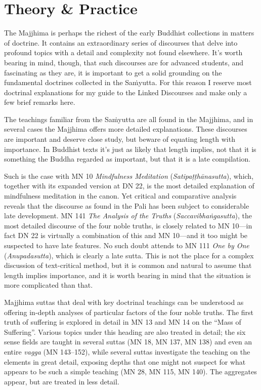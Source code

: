 \documentclass[12pt,openany]{book}%
\begin{document}
\section*{Theory \& Practice}

The Majjhima is perhaps the richest of the early Buddhist collections in matters of doctrine. It contains an extraordinary series of discourses that delve into profound topics with a detail and complexity not found elsewhere. It’s worth bearing in mind, though, that such discourses are for advanced students, and fascinating as they are, it is important to get a solid grounding on the fundamental doctrines collected in the \textsanskrit{Saṁyutta}. For this reason I reserve most doctrinal explanations for my guide to the Linked Discourses and make only a few brief remarks here.

The teachings familiar from the \textsanskrit{Saṁyutta} are all found in the Majjhima, and in several cases the Majjhima offers more detailed explanations. These discourses are important and deserve close study, but beware of equating length with importance. In Buddhist texts it’s just as likely that length implies, not that it is something the Buddha regarded as important, but that it is a late compilation.

Such is the case with MN 10 \textit{Mindfulness Meditation} (\textit{\textsanskrit{Satipaṭṭhānasutta}}), which, together with its expanded version at DN 22, is the most detailed explanation of mindfulness meditation in the canon. Yet critical and comparative analysis reveals that the discourse as found in the Pali has been subject to considerable late development. MN 141 \textit{The Analysis of the Truths} (\textit{\textsanskrit{Saccavibhaṅgasutta}}), the most detailed discourse of the four noble truths, is closely related to MN 10—in fact DN 22 is virtually a combination of this and MN 10—and it too might be suspected to have late features. No such doubt attends to MN 111 \textit{One by One} (\textit{Anupadasutta}), which is clearly a late sutta. This is not the place for a complex discussion of text-critical method, but it is common and natural to assume that length implies importance, and it is worth bearing in mind that the situation is more complicated than that.

Majjhima suttas that deal with key doctrinal teachings can be understood as offering in-depth analyses of particular factors of the four noble truths. The first truth of suffering is explored in detail in MN 13 and MN 14 on the “Mass of Suffering”. Various topics under this heading are also treated in detail; the six sense fields are taught in several suttas (MN 18, MN 137, MN 138) and even an entire \textit{vagga} (MN 143–152), while several suttas investigate the teaching on the elements in great detail, exposing depths that one might not suspect for what appears to be such a simple teaching (MN 28, MN 115, MN 140). The aggregates appear, but are treated in less detail.
\end{document}
